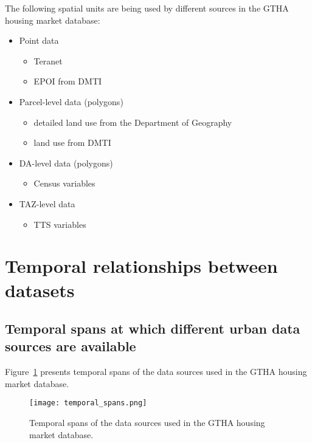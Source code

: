 The following spatial units are being used by different sources in the GTHA housing market database:

\begin{itemize}
    \item Point data
    \begin{itemize}
        \item Teranet
        \item EPOI from DMTI
    \end{itemize}
    \item Parcel-level data (polygons)
    \begin{itemize}
        \item detailed land use from the Department of Geography
        \item land use from DMTI
    \end{itemize}
    \item DA-level data (polygons)
    \begin{itemize}
        \item Census variables
    \end{itemize}
    \item TAZ-level data
    \begin{itemize}
        \item TTS variables
    \end{itemize}
\end{itemize}


\section{Temporal relationships between datasets} \label{sec:termporal_relationships_between_datasets}

\subsection{Temporal spans at which different urban data sources are available} \label{subsec:temporal_scales}

Figure~\ref{fig:temporal_spans} presents temporal spans of the data sources used in the GTHA housing market database.
\begin{figure}[hbt!]
    \centering
    \texttt{[image: temporal\_spans.png]}
    \caption{Temporal spans of the data sources used in the GTHA housing market database.}
    \label{fig:temporal_spans}
\end{figure}

